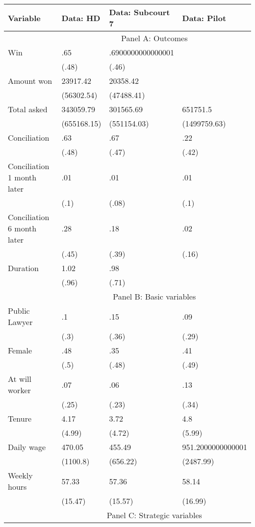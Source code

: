 \begin{tabular}{llll}
\toprule
Variable & Data: HD & Data: Subcourt 7 & Data: Pilot \\
\midrule
\midrule
      & \multicolumn{3}{c}{Panel A: Outcomes} \\
\cmidrule{2-4}Win   & .65   & .6900000000000001 &  \\
      & (.48) & (.46) &  \\
Amount won & 23917.42 & 20358.42 &  \\
      & (56302.54) & (47488.41) &  \\
Total asked & 343059.79 & 301565.69 & 651751.5 \\
      & (655168.15) & (551154.03) & (1499759.63) \\
Conciliation  & .63   & .67   & .22 \\
      & (.48) & (.47) & (.42) \\
Conciliation 1 month later & .01   & .01   & .01 \\
      & (.1)  & (.08) & (.1) \\
Conciliation 6 month later & .28   & .18   & .02 \\
      & (.45) & (.39) & (.16) \\
Duration & 1.02  & .98   &  \\
      & (.96) & (.71) &  \\
\cmidrule{2-4}      & \multicolumn{3}{c}{Panel B: Basic variables} \\
\cmidrule{2-4}Public Lawyer & .1    & .15   & .09 \\
      & (.3)  & (.36) & (.29) \\
Female & .48   & .35   & .41 \\
      & (.5)  & (.48) & (.49) \\
At will worker & .07   & .06   & .13 \\
      & (.25) & (.23) & (.34) \\
Tenure & 4.17  & 3.72  & 4.8 \\
      & (4.99) & (4.72) & (5.99) \\
Daily wage & 470.05 & 455.49 & 951.2000000000001 \\
      & (1100.8) & (656.22) & (2487.99) \\
Weekly hours & 57.33 & 57.36 & 58.14 \\
      & (15.47) & (15.57) & (16.99) \\
\cmidrule{2-4}      & \multicolumn{3}{c}{Panel C: Strategic  variables} \\

\end{tabular}
